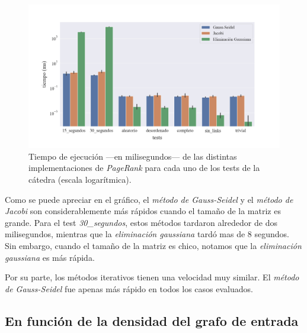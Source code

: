 \begin{figure}[!htbp]
    \centering
    \includegraphics[width=1\textwidth, trim=0 0 0 30]{files/src/.media/tiempo-ejecucion.png}
    \caption{Tiempo de ejecución ---en milisegundos--- de las distintas implementaciones de \textit{PageRank} para cada uno de los tests de la cátedra (escala logarítmica).} \label{tiempo_ej}
\end{figure}


\vspace{1em}
Como se puede apreciar en el gráfico, el \textit{método de Gauss-Seidel} y el \textit{método de Jacobi} son considerablemente más rápidos cuando el tamaño de la matriz es grande. Para el test \textit{30\_segundos}, estos métodos tardaron alrededor de dos milisegundos, mientras que la \textit{eliminación gaussiana} tardó mas de 8 segundos. Sin embargo, cuando el tamaño de la matriz es chico, notamos que la \textit{eliminación gaussiana} es más rápida. 

Por su parte, los métodos iterativos tienen una velocidad muy similar. El \textit{método de Gauss-Seidel} fue apenas más rápido en todos los casos evaluados.


\vspace{2em}
\subsection{En función de la densidad del grafo de entrada}
